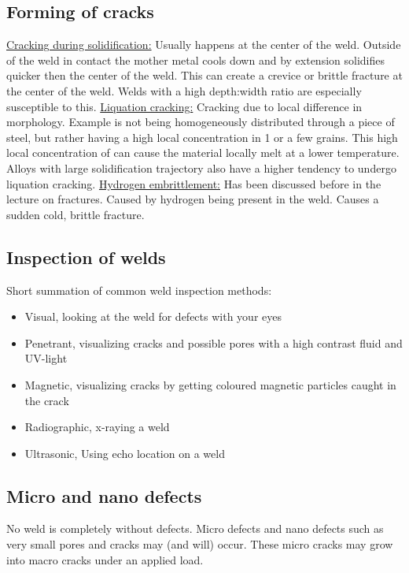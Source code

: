 \documentclass[11pt, a4paper]{article}
\begin{document}
\subsection{Forming of cracks}
\underline{Cracking during solidification:} Usually happens at the center of the weld. Outside of the weld in contact the mother metal cools down and by extension solidifies quicker then the center of the weld. This can create a crevice or brittle fracture at the center of the weld. Welds with a high depth:width ratio are especially susceptible to this.
\newline
\underline{Liquation cracking:} Cracking due to local difference in morphology. Example is  not being homogeneously distributed through a piece of steel, but rather having a high local concentration in 1 or a few grains. This high local concentration of  can cause the material locally melt at a lower temperature. Alloys with large solidification trajectory also have a higher tendency to undergo liquation cracking.
\newline
\underline{Hydrogen embrittlement:} Has been discussed before in the lecture on fractures. Caused by hydrogen being present in the weld. Causes a sudden cold, brittle fracture.


\subsection{Inspection of welds}
Short summation of common weld inspection methods:
\begin{itemize}
  \item Visual, looking at the weld for defects with your eyes
  \item Penetrant, visualizing cracks and possible pores with a high contrast fluid and UV-light
  \item Magnetic, visualizing cracks by getting coloured magnetic particles caught in the crack
  \item Radiographic, x-raying a weld
  \item Ultrasonic, Using echo location on a weld
\end{itemize}


\subsection{Micro and nano defects}
No weld is completely without defects. Micro defects and nano defects such as very small pores and cracks may (and will) occur. These micro cracks may grow into macro cracks under an applied load.
\end{document}
